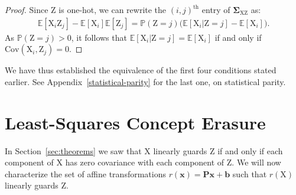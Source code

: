 \documentclass{article}
\theoremstyle{plain}
\newtheorem{corollary}[theorem]{Corollary}
\theoremstyle{remark}
\newcommand{\sxz}{\mathbf \Sigma_{\rv X \rv Z}}
\newcommand{\E}{\mathbb E}
\newcommand{\xx}{\boldsymbol{x}}
\theoremstyle{plain}
\theoremstyle{TheoremNum}
\newcommand{\rv}[1]{{\mathrm{#1}}}
\begin{document}
\begin{proof}
    Since $\rv Z$ is one-hot, we can rewrite the $(i, j)^\text{th}$ entry of $\sxz$ as:
    \begin{align*}
        \E[\rv X_i \rv Z_j] - \E[\rv X_i] \E[\rv Z_j]
        = \mathbb P(\rv Z = j) \Big( \E[\rv X_i | \rv Z = j] - \E[\rv X_i] \Big).
    \end{align*}
    As $\mathbb P(\rv Z = j) > 0$, it follows that $\E[\rv X_i | \rv Z = j] = \E[\rv X_i]$ if and only if $\mathrm{Cov}(\rv X_i, \rv Z_j) = 0$.
\end{proof}

We have thus established the equivalence of the first four conditions stated earlier. See Appendix~\ref{statistical-parity} for the last one, on statistical parity.





%

\section{Least-Squares Concept Erasure}
\label{sec:leace}
In Section~\ref{sec:theorems} we saw that $\rv X$ linearly guards $\rv Z$ if and only if each component of $\rv X$ has zero covariance with each component of $\rv Z$. We will now characterize the set of affine transformations $r(\mathbf{x}) = \mathbf{P}\xx + \mathbf{b}$ such that $r(\rv X)$ linearly guards $\rv Z$.
\end{document}
